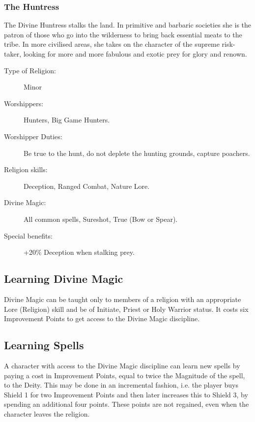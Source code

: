 \subsubsection{The Huntress}
The Divine Huntress stalks the land. In primitive and barbaric societies she is the patron of those who go into the wilderness to bring back essential meats to the tribe. In more civilised areas, she takes on the character of the supreme risk-taker, looking for more and more fabulous and exotic prey for glory and renown.

\begin{description}
\item[Type of Religion:] Minor
\item[Worshippers:] Hunters, Big Game Hunters.
\item[Worshipper Duties:] Be true to the hunt, do not deplete the hunting grounds, capture poachers.
\item[Religion skills:] Deception, Ranged Combat, Nature Lore.
\item[Divine Magic:] All common spells, Sureshot, True (Bow or Spear).
\item[Special benefits:] +20\% Deception when stalking prey.
\end{description}



\subsection{Learning Divine Magic}
Divine Magic can be taught only to members of a religion with an appropriate Lore (Religion) skill and be of Initiate, Priest or Holy Warrior status. It costs six Improvement Points to get access to the Divine Magic discipline.


\subsection{Learning Spells}
A character with access to the Divine Magic discipline can learn new spells by paying a cost in Improvement Points, equal to twice the Magnitude of the spell, to the Deity. This may be done in an incremental fashion, i.e. the player buys Shield 1 for two Improvement Points and then later increases this to Shield 3, by spending an additional four points. These points are not regained, even when the character leaves the religion.


